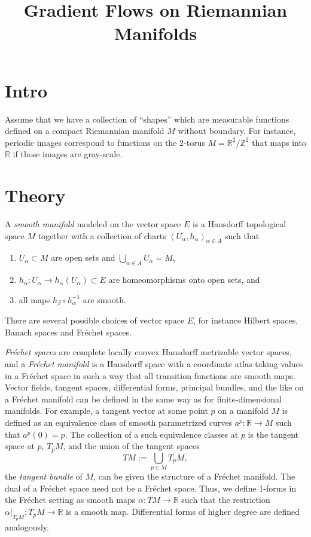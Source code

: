 \documentclass{article}
\title{Gradient Flows on Riemannian Manifolds}
\theoremstyle{plain}
\theoremstyle{definition}
\newcommand{\Z}{\ensuremath{\mathbb{Z}}}
\newcommand{\R}{\ensuremath{\mathbb{R}}}
\begin{document}
\maketitle 
\thispagestyle{empty}
\tableofcontents

\section{Intro}
Assume that we have a collection of ``shapes'' which are measurable functions defined on a compact Riemannian manifold $M$ without boundary. For instance, periodic images correspond to functions on the 2-torus $M=\R^2/\Z^2$ that maps into $\R$ if those images are gray-scale.



\section{Theory}
A \textit{smooth manifold} modeled on the vector space $E$ is a Hausdorff  topological space $M$ together with a collection of charts $(U_\alpha,h_\alpha)_{\alpha\in A}$ such that 
%
\begin{enumerate}
	\item $U_\alpha \subset M$ are open sets and $\bigcup_{\alpha\in A}U_\alpha = M$,
	\item $h_\alpha:U_\alpha\to h_\alpha(U_\alpha)\subset E$ are homeomorphisms onto open sets, and
	\item all maps $h_\beta \circ h^{-1}_\alpha$ are smooth.
\end{enumerate}
%
There are several possible choices of vector space $E$, for instance Hilbert spaces, Banach spaces and Fréchet spaces.

\textit{Fréchet spaces} are complete locally convex Hausdorff metrizable vector spaces, and a \textit{Fréchet manifold} is a Hausdorff space with a coordinate atlas taking values in a Fréchet space in such a way that all transition functions are smooth maps. Vector fields, tangent spaces, differential forms, principal bundles, and the like on a Fréchet manifold can be defined in the same way as for finite-dimensional manifolds. For example, a tangent vector at some point $p$ on a manifold $M$ is defined as an equivalence class of smooth parametrized curves $a^p:\R\to M$ such that $a^p(0)=p$. The collection of a such equivalence classes at $p$ is the tangent space at $p$, $T_pM$, and the union of the tangent spaces
\[
TM:=\bigcup_{p\in M}T_pM,
\]
the \textit{tangent bundle} of $M$, can be given the structure of a Fréchet manifold. The dual of a Fréchet space need not be a Fréchet space. Thus, we define 1-forms in the Fréchet setting as smooth maps $\alpha: TM\to\R$ such that the restriction $\alpha|_{T_pM}:T_pM\to\R$ is a smooth map. Differential forms of higher degree are defined analogously.
\end{document}

